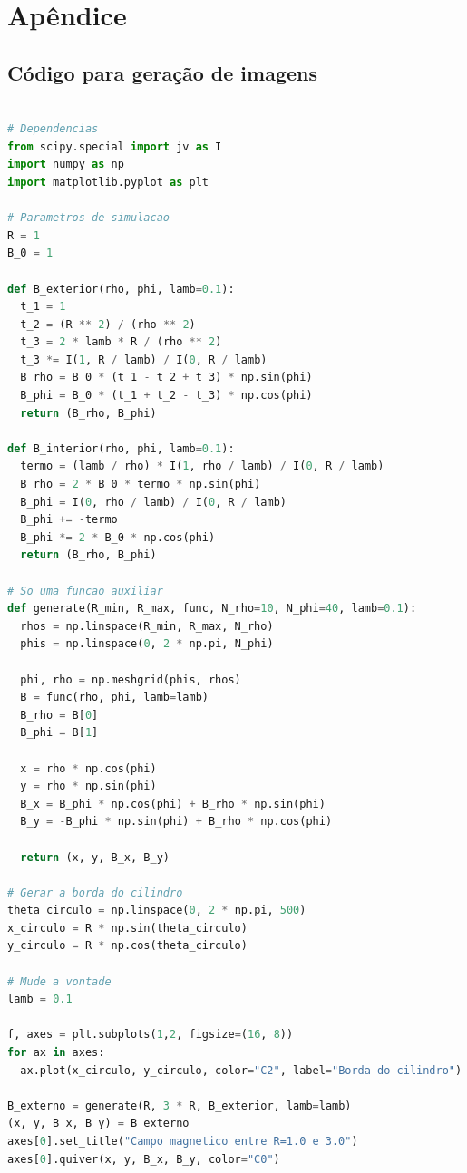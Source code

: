\documentclass[%
 reprint,
 amsmath,amssymb,
 aps,
]{revtex4-1}
\begin{document}
\section{Apêndice}

\subsection{Código para geração de imagens}

\begin{tiny}
\begin{lstlisting}[language=Python]

# Dependencias
from scipy.special import jv as I
import numpy as np
import matplotlib.pyplot as plt

# Parametros de simulacao
R = 1
B_0 = 1

def B_exterior(rho, phi, lamb=0.1):
  t_1 = 1
  t_2 = (R ** 2) / (rho ** 2)
  t_3 = 2 * lamb * R / (rho ** 2)
  t_3 *= I(1, R / lamb) / I(0, R / lamb)
  B_rho = B_0 * (t_1 - t_2 + t_3) * np.sin(phi)  
  B_phi = B_0 * (t_1 + t_2 - t_3) * np.cos(phi)
  return (B_rho, B_phi)
  
def B_interior(rho, phi, lamb=0.1):
  termo = (lamb / rho) * I(1, rho / lamb) / I(0, R / lamb)
  B_rho = 2 * B_0 * termo * np.sin(phi)
  B_phi = I(0, rho / lamb) / I(0, R / lamb)
  B_phi += -termo
  B_phi *= 2 * B_0 * np.cos(phi)
  return (B_rho, B_phi)
  
# So uma funcao auxiliar
def generate(R_min, R_max, func, N_rho=10, N_phi=40, lamb=0.1):
  rhos = np.linspace(R_min, R_max, N_rho)
  phis = np.linspace(0, 2 * np.pi, N_phi)

  phi, rho = np.meshgrid(phis, rhos)
  B = func(rho, phi, lamb=lamb)
  B_rho = B[0]
  B_phi = B[1]
  
  x = rho * np.cos(phi)
  y = rho * np.sin(phi)
  B_x = B_phi * np.cos(phi) + B_rho * np.sin(phi)
  B_y = -B_phi * np.sin(phi) + B_rho * np.cos(phi)
  
  return (x, y, B_x, B_y)
 
# Gerar a borda do cilindro 
theta_circulo = np.linspace(0, 2 * np.pi, 500)
x_circulo = R * np.sin(theta_circulo)
y_circulo = R * np.cos(theta_circulo)

# Mude a vontade
lamb = 0.1

f, axes = plt.subplots(1,2, figsize=(16, 8))
for ax in axes:
  ax.plot(x_circulo, y_circulo, color="C2", label="Borda do cilindro")
  
B_externo = generate(R, 3 * R, B_exterior, lamb=lamb)
(x, y, B_x, B_y) = B_externo
axes[0].set_title("Campo magnetico entre R=1.0 e 3.0")
axes[0].quiver(x, y, B_x, B_y, color="C0")


\end{lstlisting}
\end{tiny}
\end{document}
